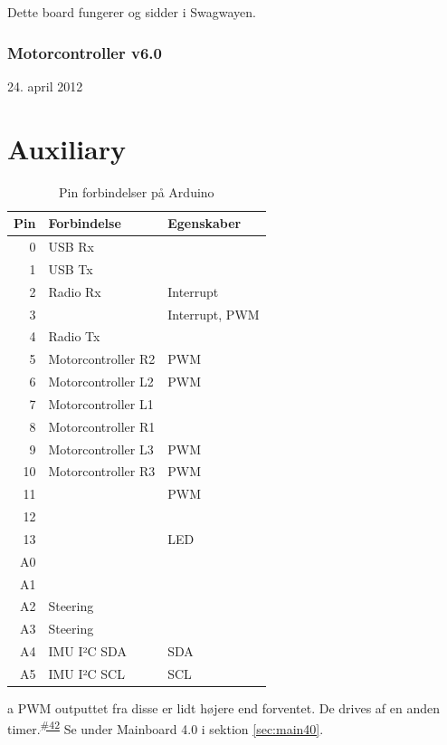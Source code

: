 \documentclass[a4paper,oneside,article,danish,table]{memoir}
\newcommand{\boarddate}[1]{\textcolor{blue!80!black}{#1}}
\newcommand{\issue}[1]{\textsuperscript{\textcolor{blue!80!black}{\href{https://github.com/neic/Swagway/issues/#1}{\##1}}}}
\begin{document}
Dette board fungerer og sidder i Swagwayen.

\subsection{Motorcontroller v6.0}
\boarddate{24. april 2012}

\chapter{Auxiliary}
\begin{table}[htbp]
  \caption{Pin forbindelser på Arduino}
  \centering
  \begin{threeparttable}
    \begin{tabular}{rll}
      \toprule
      Pin & Forbindelse & Egenskaber\\
      \midrule
      0 & USB Rx & \\
      1 & USB Tx & \\
      2 & Radio Rx & Interrupt\\
      3 & & Interrupt, PWM\\
      4 & Radio Tx & \\
      5 & Motorcontroller R2 & PWM\tnote{a}\\
      6 & Motorcontroller L2 & PWM\tnote{a}\\
      7 & Motorcontroller L1 & \\
      8 & Motorcontroller R1 & \\
      9 & Motorcontroller L3 & PWM\\
      10 & Motorcontroller R3 & PWM\\
      11 & & PWM\\
      12 & & \\
      13 & & LED\\
      A0 & & \\
      A1 & & \\
      A2 & Steering & \\
      A3 & Steering & \\
      A4 & IMU I²C SDA & SDA\\
      A5 & IMU I²C SCL & SCL
    \end{tabular}
    \begin{tablenotes}
      \item[a]{PWM outputtet fra disse er lidt højere end forventet. De drives af en anden timer.\issue{42} Se under Mainboard 4.0 i sektion \ref{sec:main40}.}
    \end{tablenotes}
  \end{threeparttable}
\end{table}
\end{document}
